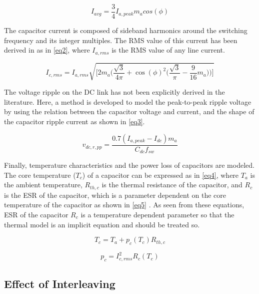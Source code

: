 \documentclass[conference,a4paper,twocolumn]{IEEEtran}
\begin{document}
\begin{equation}
\label{eq1}
I_{avg} = \frac{3}{4}I_{a,peak}m_acos(\phi)
\end{equation}


The capacitor current is composed of sideband harmonics around the switching frequency and its integer multiples. The RMS value of this current has been derived in \cite{Su2010,Bianchi2003} as in \ref{eq2}, where $I_{a,rms}$ is the RMS value of any line current.

\begin{equation}
\label{eq2}
I_{c,rms} = I_{a,rms}\sqrt{\bigg[2m_a\Big(\frac{\sqrt{3}}{4\pi}+\cos(\phi)^2\big(\frac{\sqrt{3}}{\pi}-\frac{9}{16}m_a\big)\Big)\bigg]}
\end{equation}


The voltage ripple on the DC link has not been explicitly derived in the literature. Here, a method is developed to model the peak-to-peak ripple voltage by using the relation between the capacitor voltage and current, and the shape of the capacitor ripple current as shown in \ref{eq3}.


\begin{equation}
\label{eq3}
v_{dc,r,pp} = \frac{0.7(I_{a,peak}-I_{dc})m_a}{C_{dc}f_{sw}}
\end{equation}


Finally, temperature characteristics and the power loss of capacitors are modeled. The core temperature ($T_c$) of a capacitor can be expressed as in \ref{eq4}, where $T_a$ is the ambient temperature, $R_{th,c}$ is the thermal resistance of the capacitor, and $R_c$ is the ESR of the capacitor, which is a parameter dependent on the core temperature of the capacitor as shown in \ref{eq5} \cite{Bianchi2003}. As seen from these equations, ESR of the capacitor $R_c$ is a temperature dependent parameter so that the thermal model is an implicit equation and should be treated so.


\begin{equation}
\label{eq4}
T_{c} = T_{a}+p_{c}(T_{c})R_{th,c}
\end{equation}


\begin{equation}
\label{eq5}
p_{c} = I_{c,rms}^2R_{c}(T_c)
\end{equation}


\subsection{Effect of Interleaving}
\end{document}
